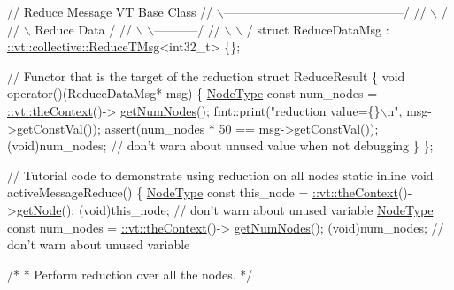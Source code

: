 \begin{DoxyCodeInclude}
\textcolor{comment}{//                       Reduce Message VT Base Class}
\textcolor{comment}{//                 \(\backslash\)--------------------------------------------/}
\textcolor{comment}{//                  \(\backslash\)                                          /}
\textcolor{comment}{//                   \(\backslash\)                            Reduce Data /}
\textcolor{comment}{//                    \(\backslash\)                          \(\backslash\)-----------/}
\textcolor{comment}{//                     \(\backslash\)                          \(\backslash\)         /}
\textcolor{keyword}{struct }ReduceDataMsg : \hyperlink{structvt_1_1collective_1_1reduce_1_1operators_1_1_reduce_t_msg}{::vt::collective::ReduceTMsg}<int32\_t> \{\};


\textcolor{comment}{// Functor that is the target of the reduction}
\textcolor{keyword}{struct }ReduceResult \{
  \textcolor{keywordtype}{void} operator()(ReduceDataMsg* msg) \{
    \hyperlink{namespacevt_a866da9d0efc19c0a1ce79e9e492f47e2}{NodeType} \textcolor{keyword}{const} num\_nodes = \hyperlink{namespacevt_a26551fe0e6e6a1371111df5b12c7e92c}{::vt::theContext}()->
      \hyperlink{structvt_1_1ctx_1_1_context_a7f41071aadf6d5fa9e1b6c703c5ff19d}{getNumNodes}();
    fmt::print(\textcolor{stringliteral}{"reduction value=\{\}\(\backslash\)n"}, msg->getConstVal());
    assert(num\_nodes * 50 == msg->getConstVal());
    (void)num\_nodes;  \textcolor{comment}{// don't warn about unused value when not debugging}
  \}
\};


\textcolor{comment}{// Tutorial code to demonstrate using reduction on all nodes}
\textcolor{keyword}{static} \textcolor{keyword}{inline} \textcolor{keywordtype}{void} activeMessageReduce() \{
  \hyperlink{namespacevt_a866da9d0efc19c0a1ce79e9e492f47e2}{NodeType} \textcolor{keyword}{const} this\_node = \hyperlink{namespacevt_a26551fe0e6e6a1371111df5b12c7e92c}{::vt::theContext}()->\hyperlink{structvt_1_1ctx_1_1_context_a0d52c263ce8516546a67443d9a86fa5f}{getNode}();
  (void)this\_node;  \textcolor{comment}{// don't warn about unused variable}
  \hyperlink{namespacevt_a866da9d0efc19c0a1ce79e9e492f47e2}{NodeType} \textcolor{keyword}{const} num\_nodes = \hyperlink{namespacevt_a26551fe0e6e6a1371111df5b12c7e92c}{::vt::theContext}()->
      \hyperlink{structvt_1_1ctx_1_1_context_a7f41071aadf6d5fa9e1b6c703c5ff19d}{getNumNodes}();
  (void)num\_nodes;  \textcolor{comment}{// don't warn about unused variable}

  \textcolor{comment}{/*}
\textcolor{comment}{   * Perform reduction over all the nodes.}
\textcolor{comment}{   */}


\end{DoxyCodeInclude}
